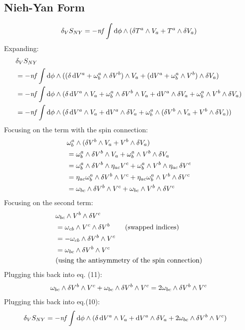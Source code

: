 \documentclass[12pt]{article}
\begin{document}
\subsection{Nieh-Yan Form}
\begin{align*}
  \var_V{S_{NY}} = -\mathit{nf}\int \dd\phi \wedge (\var{T^a} \wedge V_a + T^a \wedge \var{V_a})
\end{align*}
Expanding:
\begin{align}
  &\var_V{S_{NY}} \nonumber \\ &= -\mathit{nf}\int \dd\phi \wedge ((\var{\dd{V^a}} + \omega^a_b \wedge \var{V^b}) \wedge V_a + (\dd V^a + \omega^a_b \wedge V^b) \wedge \var{V_a}) \nonumber \\
  &= -\mathit{nf}\int \dd\phi \wedge (\var{\dd{V^a}} \wedge V_a + \omega^a_b \wedge \var{V^b} \wedge V_a + \dd V^a \wedge \var{V_a} + \omega^a_b \wedge V^b \wedge \var{V_a}) \nonumber \\
  &= -\mathit{nf}\int \dd\phi \wedge (\var{\dd{V^a}} \wedge V_a + \dd V^a \wedge \var{V_a} + \omega^a_b \wedge (\var{V^b} \wedge V_a + V^b \wedge \var{V_a}))
\end{align}
Focusing on the term with the spin connection:
\begin{align}
  &\omega^a_b \wedge (\var{V^b} \wedge V_a + V^b \wedge \var{V_a}) \nonumber \\
  &= \omega^a_b \wedge \var{V^b} \wedge V_a + \omega^a_b \wedge V^b \wedge \var{V_a} \nonumber \\
  &= \omega^a_b \wedge \var{V^b} \wedge \eta_{ac}V^c + \omega^a_b \wedge V^b \wedge \eta_{ac}\var{V^c} \nonumber \\
  &= \eta_{ac}\omega^a_b \wedge \var{V^b} \wedge V^c + \eta_{ac}\omega^a_b \wedge V^b \wedge \var{V^c} \nonumber \\
  &= \omega_{bc} \wedge \var{V^b} \wedge V^c + \omega_{bc} \wedge V^b \wedge \var{V^c}
\end{align}
Focusing on the second term:
\begin{align*}
  &\omega_{bc} \wedge V^b \wedge \var{V^c} \\
  &=\omega_{cb} \wedge V^c \wedge \var{V^b} \qquad \text{(swapped indices)} \\
  &=-\omega_{cb} \wedge \var{V^b} \wedge V^c \\
  &=\omega_{bc} \wedge \var{V^b} \wedge V^c \\ &\text{(using the antisymmetry of the spin connection)}
\end{align*}
Plugging this back into eq. (11):
\begin{align*}
  \omega_{bc} \wedge \var{V^b} \wedge V^c + \omega_{bc} \wedge \var{V^b} \wedge V^c = 2\omega_{bc} \wedge \var{V^b} \wedge V^c
\end{align*}
Plugging this back into eq.(10):
\begin{align}
  \var_V{S_{NY}} &= -\mathit{nf}\int \dd\phi \wedge (\var{\dd{V^a}} \wedge V_a + \dd V^a \wedge \var{V_a} + 2\omega_{bc} \wedge \var{V^b} \wedge V^c)
\end{align}
\end{document}
